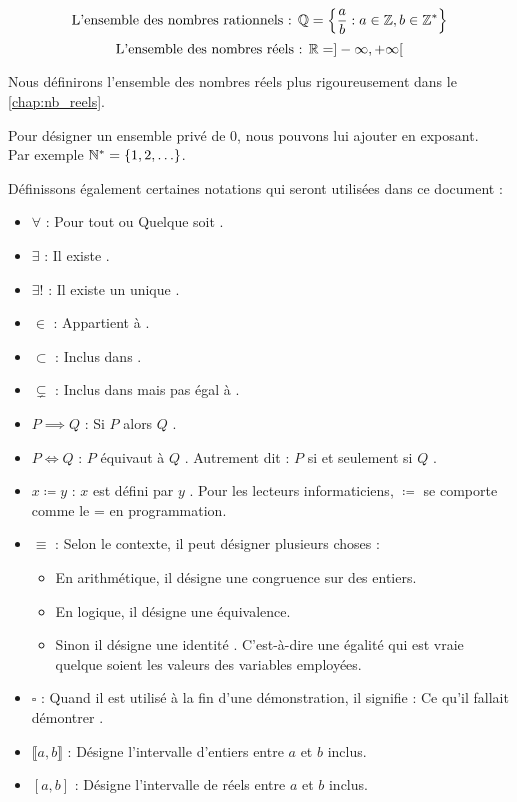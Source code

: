 \[ \text{L'ensemble des nombres rationnels : } \mathbb{Q} = \left\{ \frac{a}{b}  : a \in \mathbb{Z}, b \in \mathbb{Z}^* \right\} \]
\[ \text{L'ensemble des nombres réels : } \mathbb{R} = ]-\infty, +\infty[ \]
\par \noindent Nous définirons l'ensemble des nombres réels plus rigoureusement dans le \autoref{chap:nb_reels}.
\\
\par \noindent Pour désigner un ensemble privé de 0, nous pouvons lui ajouter \og * \fg en exposant. 
\\ 
Par exemple $\mathbb{N}^* = \{1, 2, \ldots\}$.
\\
\par \noindent Définissons également certaines notations qui seront utilisées dans ce document :
\begin{itemize}
    \item $\forall$ : \og Pour tout \fg ou \og Quelque soit \fg.
    \item $\exists$ : \og Il existe \fg.
    \item $\exists!$ : \og Il existe un unique \fg.
    \item $\in$ : \og Appartient à \fg.
    \item $\subset$ : \og Inclus dans \fg.
    \item $\subsetneq$ : \og Inclus dans mais pas égal à \fg.
    \item $P \implies Q$ : \og Si $P$ alors $Q$ \fg.
    \item $P \iff Q$ : \og $P$ équivaut à $Q$ \fg. Autrement dit : \og $P$ si et seulement si $Q$ \fg.
    \item $x \coloneqq y$ : \og $x$ est défini par $y$ \fg. Pour les lecteurs informaticiens, \og $\coloneqq$ \fg se comporte comme le \og = \fg en programmation.
    \item $\equiv$ : Selon le contexte, il peut désigner plusieurs choses \cite{symbole_congru_wikipedia}:
    \begin{itemize}
        \item En arithmétique, il désigne une congruence sur des entiers.
        \item En logique, il désigne une équivalence.
        \item Sinon il désigne une \og identité \fg. C'est-à-dire une égalité qui est vraie quelque soient les valeurs des variables employées.
    \end{itemize}
    \item $\square$ : Quand il est utilisé à la fin d'une démonstration, il signifie : \og Ce qu'il fallait démontrer \fg.
    \item $\llbracket a, b \rrbracket$ : Désigne l'intervalle d'entiers entre $a$ et $b$ inclus.
    \item $[a, b]$ : Désigne l'intervalle de réels entre $a$ et $b$ inclus.
\end{itemize}

